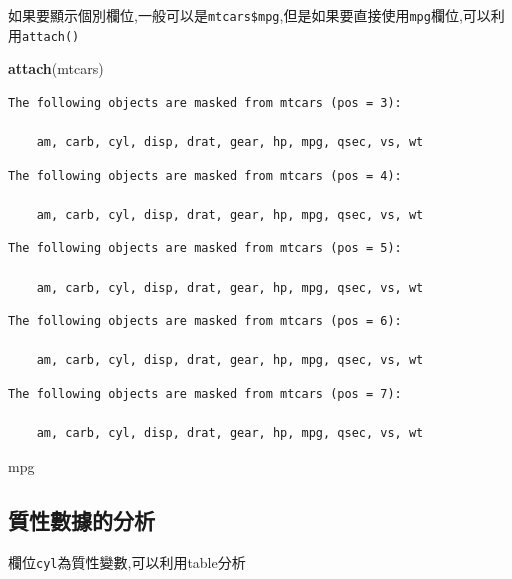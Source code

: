 \documentclass[]{book}
\newenvironment{Shaded}{\begin{snugshade}}{\end{snugshade}}
\newcommand{\KeywordTok}[1]{\textcolor[rgb]{0.13,0.29,0.53}{\textbf{#1}}}
\newcommand{\NormalTok}[1]{#1}
\theoremstyle{definition}
\theoremstyle{definition}
\theoremstyle{definition}
\theoremstyle{remark}
\begin{document}
如果要顯示個別欄位,一般可以是\texttt{mtcars\$mpg},但是如果要直接使用\texttt{mpg}欄位,可以利用\texttt{attach()}

\begin{Shaded}
\begin{Highlighting}[]
\KeywordTok{attach}\NormalTok{(mtcars)}
\end{Highlighting}
\end{Shaded}

\begin{verbatim}
The following objects are masked from mtcars (pos = 3):

    am, carb, cyl, disp, drat, gear, hp, mpg, qsec, vs, wt
\end{verbatim}

\begin{verbatim}
The following objects are masked from mtcars (pos = 4):

    am, carb, cyl, disp, drat, gear, hp, mpg, qsec, vs, wt
\end{verbatim}

\begin{verbatim}
The following objects are masked from mtcars (pos = 5):

    am, carb, cyl, disp, drat, gear, hp, mpg, qsec, vs, wt
\end{verbatim}

\begin{verbatim}
The following objects are masked from mtcars (pos = 6):

    am, carb, cyl, disp, drat, gear, hp, mpg, qsec, vs, wt
\end{verbatim}

\begin{verbatim}
The following objects are masked from mtcars (pos = 7):

    am, carb, cyl, disp, drat, gear, hp, mpg, qsec, vs, wt
\end{verbatim}

\begin{Shaded}
\begin{Highlighting}[]
\NormalTok{mpg}
\end{Highlighting}
\end{Shaded}

\subsection{質性數據的分析}

欄位\texttt{cyl}為質性變數,可以利用table分析
\end{document}

